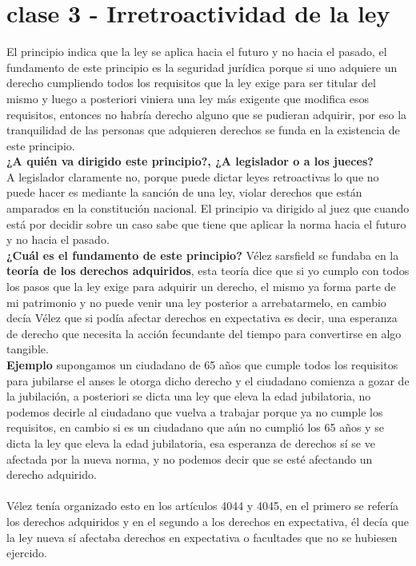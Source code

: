 \documentclass[12pt]{book}
\begin{document}
\chapter{clase 3 - Irretroactividad de la ley}
El principio indica que la ley se aplica hacia el futuro y no hacia el pasado, el fundamento de este principio es la seguridad jurídica porque si uno adquiere un derecho cumpliendo todos los requisitos que la ley exige para ser titular del mismo y luego a posteriori viniera una ley más exigente que modifica esos requisitos, entonces no habría derecho alguno que se pudieran adquirir, por eso la tranquilidad de las personas que adquieren derechos se funda en la existencia de este principio.
\\
\textbf{¿A quién va dirigido este principio?, ¿A legislador o a los jueces?}
\\
A legislador claramente no, porque puede dictar leyes retroactivas lo que no puede hacer es mediante la sanción de una ley, violar derechos que están amparados en la constitución nacional.
El principio va dirigido al juez que cuando está por decidir sobre un caso sabe que tiene que aplicar la norma hacia el futuro y no hacia el pasado.
\\
\textbf{¿Cuál es el fundamento de este principio?}
Vélez sarsfield se fundaba en la \textbf{teoría de los derechos adquiridos}, esta teoría dice que si yo cumplo con todos los pasos que la ley exige para adquirir un derecho, el mismo ya forma parte de mi patrimonio y no puede venir una ley posterior a arrebatarmelo, en cambio decía Vélez que si podía afectar derechos en expectativa es decir, una esperanza de derecho que necesita la acción fecundante del tiempo para convertirse en algo tangible.
\\
\textbf{Ejemplo}
supongamos un ciudadano de 65 años que cumple todos los requisitos para jubilarse el anses le otorga dicho derecho y el ciudadano comienza a gozar de la jubilación, a posteriori se dicta una ley que eleva la edad jubilatoria, no podemos decirle al ciudadano que vuelva a trabajar porque ya no cumple los requisitos, en cambio si es un ciudadano que aún no cumplió los 65 años y se dicta la ley que eleva la edad jubilatoria, esa esperanza de derechos s\'i se ve afectada por la nueva norma, y no podemos decir que se esté afectando un derecho adquirido.
\\ \\
Vélez tenía organizado esto en los artículos 4044 y 4045, en el primero se refería los derechos adquiridos y en el segundo a los derechos en expectativa, él decía que la ley nueva s\'i afectaba derechos en expectativa o facultades que no se hubiesen ejercido.
\end{document}
